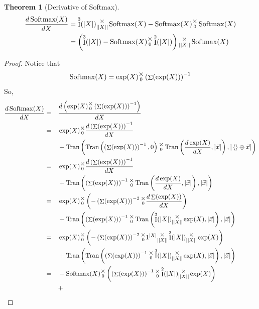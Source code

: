 \documentclass[12pt]{book}
\theoremstyle{definition}
\theoremstyle{plain}
\newtheorem{theorem}{Theorem}[chapter]
\theoremstyle{ppart}
\theoremstyle{case}
\theoremstyle{solution}
\DeclareMathOperator{\Ident}{I}
\DeclareMathOperator{\Tran}{Tran}
\DeclareMathOperator{\Softmax}{Softmax}
\DeclareMathOperator{\Sum}{\Sigma}
\newcommand{\mmult}[1]{\text{\raisebox{1ex}{$\underset{#1}{\times}$}}}
\begin{document}
\begin{landscape}
\begin{theorem}[Derivative of Softmax]
\label{softmax_derivative}
\begin{align*}
	\frac{d\Softmax(X)}{dX}
	&=
	\Ident^3(|X|) \mmult{||X||} \Softmax(X)
  -\Softmax(X) \mmult{0} \Softmax(X) \\
	&=
	\left(\Ident^3(|X|) - \Softmax(X) \mmult{0} \Ident^2(|X|) \right)
	\mmult{||X||} \Softmax(X)
\end{align*}
\end{theorem}
\begin{proof}
Notice that 
\[
	\Softmax(X) = \exp(X) \mmult{0} \left( \Sum(\exp(X)) \right)^{-1}
\]
So,
\begin{alignat}{3}
	\frac{d\Softmax(X)}{dX}
	&=&&
	\frac{d \left( \exp(X) \mmult{0} \left( \Sum(\exp(X)) \right)^{-1} \right)}{dX} \\
	&=&&
	\exp(X) \mmult{0} \frac{d \left( \Sum(\exp(X)) \right)^{-1}}{dX}
	\nonumber\\&&&+
	\Tran\left(
		\Tran\left(
			\left( \Sum(\exp(X)) \right)^{-1}
			,0
		\right)
		\mmult{0}
		\Tran\left(
			\frac{d \exp(X)}{dX}
			,|\vec{x}|
		\right)
		,|\left<\right> \oplus \vec{x}|
	\right) \\
	&=&&
	\exp(X) \mmult{0} \frac{d \left( \Sum(\exp(X)) \right)^{-1}}{dX}
	\nonumber\\&&&+
	\Tran\left(
		\left( \Sum(\exp(X)) \right)^{-1}
		\mmult{0}
		\Tran\left(
			\frac{d \exp(X)}{dX}
			,|\vec{x}|
		\right)
		,|\vec{x}|
	\right) \\
	&=&&
	\exp(X) \mmult{0} \left(
		-\left( \Sum(\exp(X)) \right)^{-2}
		\mmult{0}
		\frac{d\Sum(\exp(X))}{dX}
	\right)
	\nonumber\\&&&+
	\Tran\left(
		\left( \Sum(\exp(X)) \right)^{-1}
		\mmult{0}
		\Tran\left(
			\Ident^3(|X|) \mmult{||X||} \exp(X)
			,|\vec{x}|
		\right)
		,|\vec{x}|
	\right) \\
	&=&&
	\exp(X) \mmult{0} \left(
		-\left( \Sum(\exp(X)) \right)^{-2}
		\mmult{0}
		1^{|X|}
		\mmult{||X||}
		\Ident^3(|X|)
		\mmult{||X||}
		\exp(X)
	\right)
	\nonumber\\&&&+
	\Tran\left(
		\Tran\left(
			\left( \Sum(\exp(X)) \right)^{-1}
			\mmult{0}
			\Ident^3(|X|) \mmult{||X||} \exp(X)
		,|\vec{x}|
		\right)
		,|\vec{x}|
	\right) \\
	&=&&
	-\Softmax(X) \mmult{0} \left(
		\left( \Sum(\exp(X)) \right)^{-1}
		\mmult{0}
		\Ident^2(|X|)
		\mmult{||X||}
		\exp(X)
	\right)
	\nonumber\\&&&+

\end{alignat}
\end{proof}
\end{landscape}
\end{document}

